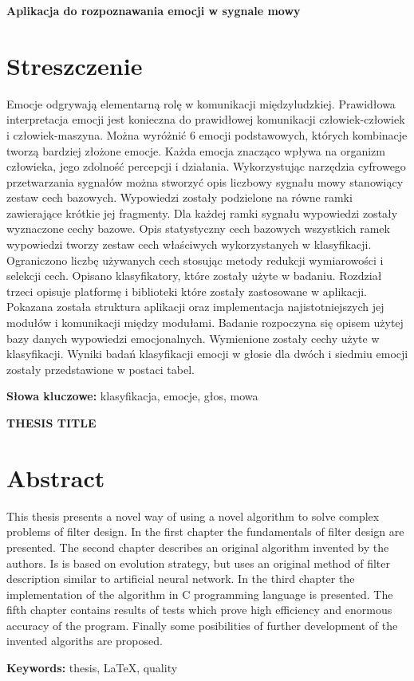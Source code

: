 \newpage
\begin{center}
\large \bf
Aplikacja do rozpoznawania emocji w sygnale mowy
\end{center}

\section*{Streszczenie}
Emocje odgrywają elementarną rolę w komunikacji międzyludzkiej.
Prawidłowa interpretacja emocji jest konieczna do prawidłowej komunikacji człowiek-człowiek i człowiek-maszyna.
Można wyróżnić 6 emocji podstawowych, których kombinacje tworzą bardziej złożone emocje.
Każda emocja znacząco wpływa na organizm człowieka, jego zdolność percepcji i działania.
Wykorzystując narzędzia cyfrowego przetwarzania sygnałów można stworzyć opis liczbowy
sygnału mowy stanowiący zestaw cech bazowych.
Wypowiedzi zostały podzielone na równe ramki zawierające krótkie jej fragmenty.
Dla każdej ramki sygnału wypowiedzi zostały wyznaczone cechy bazowe.
Opis statystyczny cech bazowych wszystkich ramek wypowiedzi tworzy zestaw cech właściwych wykorzystanych w klasyfikacji.
Ograniczono liczbę używanych cech stosując metody redukcji wymiarowości i selekcji cech.
Opisano klasyfikatory, które zostały użyte w badaniu.
Rozdział trzeci opisuje platformę i biblioteki które zostały zastosowane w aplikacji.
Pokazana została struktura aplikacji oraz implementacja najistotniejszych jej modułów i komunikacji między modułami.
Badanie rozpoczyna się opisem użytej bazy danych wypowiedzi emocjonalnych.
Wymienione zostały cechy użyte w klasyfikacji.
Wyniki badań klasyfikacji emocji w głosie dla dwóch i siedmiu emocji zostały przedstawione w postaci tabel.

\bigskip
{\noindent\bf Słowa kluczowe:} klasyfikacja, emocje, głos, mowa

\vskip 2cm


\begin{center}
\large \bf
THESIS TITLE
\end{center}

\section*{Abstract}
This thesis presents a novel way of using a novel algorithm to solve complex
problems of filter design. In the first chapter the fundamentals of filter design
are presented. The second chapter describes an original algorithm invented by the
authors. Is is based on evolution strategy, but uses an original method of filter
description similar to artificial neural network. In the third chapter the implementation
of the algorithm in C programming language is presented. The fifth chapter contains results
of tests which prove high efficiency and enormous accuracy of the program. Finally some
posibilities of further development of the invented algoriths are proposed.

\bigskip
{\noindent\bf Keywords:} thesis, LaTeX, quality

\vfill
